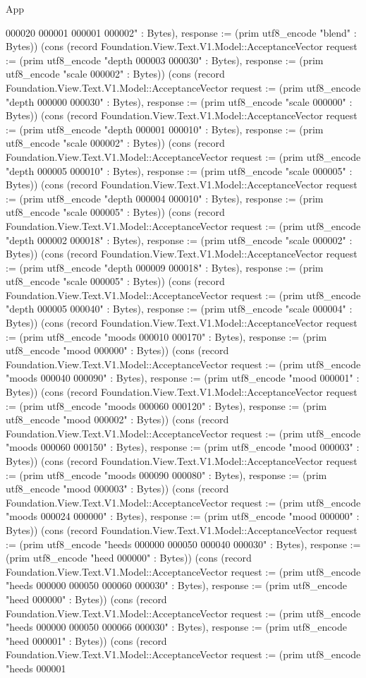 \begin{lexlean}{App}
\begin{semanticmodule}
{000020 000001 000001 000002" : Bytes), response := (prim utf8_encode "blend" : Bytes)}) (cons (record Foundation.View.Text.V1.Model::AcceptanceVector {request := (prim utf8_encode "depth 000003 000030" : Bytes), response := (prim utf8_encode "scale 000002" : Bytes)}) (cons (record Foundation.View.Text.V1.Model::AcceptanceVector {request := (prim utf8_encode "depth 000000 000030" : Bytes), response := (prim utf8_encode "scale 000000" : Bytes)}) (cons (record Foundation.View.Text.V1.Model::AcceptanceVector {request := (prim utf8_encode "depth 000001 000010" : Bytes), response := (prim utf8_encode "scale 000002" : Bytes)}) (cons (record Foundation.View.Text.V1.Model::AcceptanceVector {request := (prim utf8_encode "depth 000005 000010" : Bytes), response := (prim utf8_encode "scale 000005" : Bytes)}) (cons (record Foundation.View.Text.V1.Model::AcceptanceVector {request := (prim utf8_encode "depth 000004 000010" : Bytes), response := (prim utf8_encode "scale 000005" : Bytes)}) (cons (record Foundation.View.Text.V1.Model::AcceptanceVector {request := (prim utf8_encode "depth 000002 000018" : Bytes), response := (prim utf8_encode "scale 000002" : Bytes)}) (cons (record Foundation.View.Text.V1.Model::AcceptanceVector {request := (prim utf8_encode "depth 000009 000018" : Bytes), response := (prim utf8_encode "scale 000005" : Bytes)}) (cons (record Foundation.View.Text.V1.Model::AcceptanceVector {request := (prim utf8_encode "depth 000005 000040" : Bytes), response := (prim utf8_encode "scale 000004" : Bytes)}) (cons (record Foundation.View.Text.V1.Model::AcceptanceVector {request := (prim utf8_encode "moods 000010 000170" : Bytes), response := (prim utf8_encode "mood 000000" : Bytes)}) (cons (record Foundation.View.Text.V1.Model::AcceptanceVector {request := (prim utf8_encode "moods 000040 000090" : Bytes), response := (prim utf8_encode "mood 000001" : Bytes)}) (cons (record Foundation.View.Text.V1.Model::AcceptanceVector {request := (prim utf8_encode "moods 000060 000120" : Bytes), response := (prim utf8_encode "mood 000002" : Bytes)}) (cons (record Foundation.View.Text.V1.Model::AcceptanceVector {request := (prim utf8_encode "moods 000060 000150" : Bytes), response := (prim utf8_encode "mood 000003" : Bytes)}) (cons (record Foundation.View.Text.V1.Model::AcceptanceVector {request := (prim utf8_encode "moods 000090 000080" : Bytes), response := (prim utf8_encode "mood 000003" : Bytes)}) (cons (record Foundation.View.Text.V1.Model::AcceptanceVector {request := (prim utf8_encode "moods 000024 000000" : Bytes), response := (prim utf8_encode "mood 000000" : Bytes)}) (cons (record Foundation.View.Text.V1.Model::AcceptanceVector {request := (prim utf8_encode "heeds 000000 000050 000040 000030" : Bytes), response := (prim utf8_encode "heed 000000" : Bytes)}) (cons (record Foundation.View.Text.V1.Model::AcceptanceVector {request := (prim utf8_encode "heeds 000000 000050 000060 000030" : Bytes), response := (prim utf8_encode "heed 000000" : Bytes)}) (cons (record Foundation.View.Text.V1.Model::AcceptanceVector {request := (prim utf8_encode "heeds 000000 000050 000066 000030" : Bytes), response := (prim utf8_encode "heed 000001" : Bytes)}) (cons (record Foundation.View.Text.V1.Model::AcceptanceVector {request := (prim utf8_encode "heeds 000001 }
\end{semanticmodule}
\end{lexlean}
